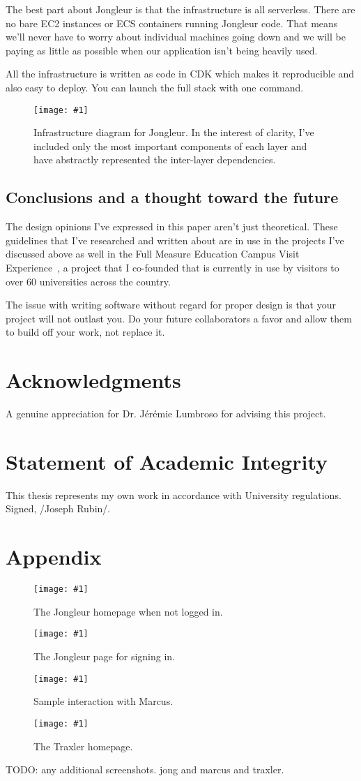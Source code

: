 \documentclass{article}
\newcommand{\screenshot}[2]{
  \begin{figure}[h]
    \texttt{[image: \#1]}
    \caption*{#2}
  \end{figure}
}
\begin{document}
The best part about Jongleur is that the infrastructure is all serverless.
There are no bare EC2 instances or ECS containers running Jongleur code.
That means we'll never have to worry about individual machines going down and we will be paying as little as possible when our application isn't being heavily used.

All the infrastructure is written as code in CDK which makes it reproducible and also easy to deploy.
You can launch the full stack with one command.~\cite{jongleur}

\screenshot{jong-infra}{Infrastructure diagram for Jongleur. In the interest of clarity, I've included only the most important components of each layer and have abstractly represented the inter-layer dependencies.}

\subsection{Conclusions and a thought toward the future}

The design opinions I've expressed in this paper aren't just theoretical.
These guidelines that I've researched and written about are in use in the projects I've discussed above as well in the Full Measure Education Campus Visit Experience~\cite{cve}, a project that I co-founded that is currently in use by visitors to over $60$ universities across the country.

The issue with writing software without regard for proper design is that your project will not outlast you.
Do your future collaborators a favor and allow them to build off your work, not replace it.

\section{Acknowledgments}

A genuine appreciation for Dr. Jérémie Lumbroso for advising this project.

\section*{Statement of Academic Integrity}

This thesis represents my own work in accordance with University regulations.\\
Signed, /Joseph Rubin/.

%





\printindex

\section{Appendix}

\screenshot{jong-home-out}{The Jongleur homepage when not logged in.}
\screenshot{jong-signin}{The Jongleur page for signing in.}
\screenshot{marcus-demo}{Sample interaction with Marcus.}
\screenshot{traxler-home}{The Traxler homepage.}

TODO: any additional screenshots.
jong and marcus and traxler.
\end{document}
